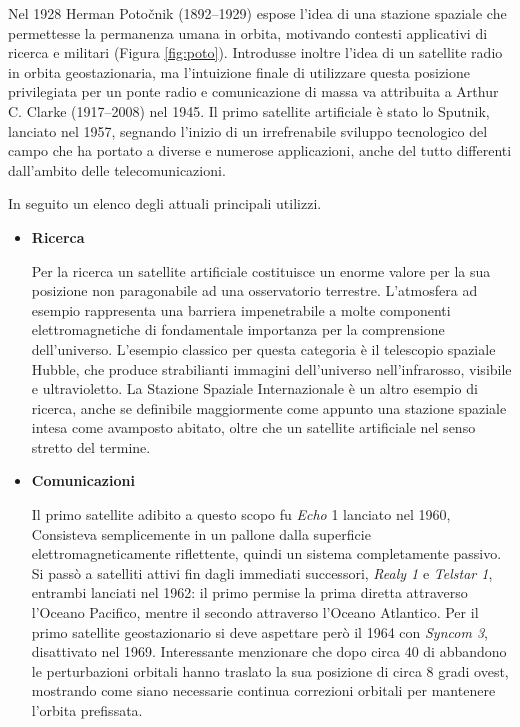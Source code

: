 \documentclass[12pt,a4paper,oneside]{book}
\begin{document}
			Nel 1928 Herman Potočnik (1892–1929) espose l'idea di una stazione spaziale che permettesse la permanenza umana in orbita, motivando contesti applicativi di ricerca e militari (Figura \ref{fig:poto}). Introdusse inoltre l'idea di un satellite radio in orbita geostazionaria, ma l'intuizione finale di utilizzare questa posizione privilegiata per un ponte radio e comunicazione di massa va attribuita a Arthur C. Clarke (1917–2008) nel 1945. Il primo satellite artificiale è stato lo Sputnik, lanciato nel 1957, segnando l'inizio di un irrefrenabile sviluppo tecnologico del campo che ha portato a diverse e numerose applicazioni, anche del tutto differenti dall'ambito delle telecomunicazioni. 
			
			In seguito un elenco degli attuali principali utilizzi.
			
			\begin{itemize}
				\item {\bf Ricerca}
				
				Per la ricerca un satellite artificiale costituisce un enorme valore per la sua posizione non paragonabile ad una osservatorio terrestre. L'atmosfera ad esempio rappresenta una barriera impenetrabile a molte componenti elettromagnetiche di fondamentale importanza per la comprensione dell'universo. L'esempio classico per questa categoria è il telescopio spaziale Hubble, che produce strabilianti immagini dell'universo nell'infrarosso, visibile e ultravioletto. La Stazione Spaziale Internazionale è un altro esempio di ricerca, anche se definibile maggiormente come appunto una stazione spaziale intesa come avamposto abitato, oltre che un satellite artificiale nel senso stretto del termine.
				
				\item {\bf Comunicazioni}
				
				Il primo satellite adibito a questo scopo fu {\it Echo} 1 lanciato nel 1960, Consisteva semplicemente in un pallone dalla superficie elettromagneticamente riflettente, quindi un sistema completamente passivo. Si passò a satelliti attivi fin dagli immediati successori, {\it Realy 1} e {\it Telstar 1}, entrambi lanciati nel 1962: il primo permise la prima diretta attraverso l'Oceano Pacifico, mentre il secondo attraverso l'Oceano Atlantico. Per il primo satellite geostazionario si deve aspettare però il 1964 con {\it Syncom 3}, disattivato nel 1969. Interessante menzionare che dopo circa 40 di abbandono le perturbazioni orbitali hanno traslato la sua posizione di circa 8 gradi ovest, mostrando come siano necessarie continua correzioni orbitali per mantenere l'orbita prefissata.
				

\end{itemize}
\end{document}
